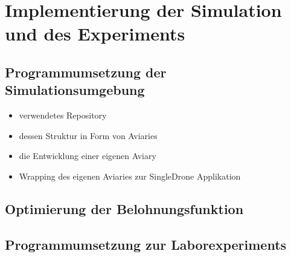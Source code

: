 \section{Implementierung der Simulation und des Experiments}
\subsection{Programmumsetzung der Simulationsumgebung}
\begin{itemize}
    \item verwendetes Repository
    \item dessen Struktur in Form von Aviaries
    \item die Entwicklung einer eigenen Aviary 
    \item Wrapping des eigenen Aviaries zur SingleDrone Applikation
\end{itemize}
\subsection{Optimierung der Belohnungsfunktion}
\subsection{Programmumsetzung zur Laborexperiments}
